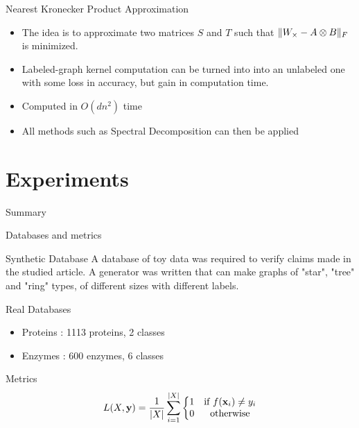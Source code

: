 \documentclass[compress]{beamer}
\DeclarePairedDelimiter{\abs}{\lvert}{\rvert}
\DeclarePairedDelimiter{\norm}{\lVert}{\rVert}
\let\vec\mathbf
\begin{document}
\begin{frame}{Nearest Kronecker Product Approximation}
\begin{itemize}
	\item The idea is to approximate two matrices $S$ and $T$ such that $\norm{W_\times - A\otimes B}_F$ is minimized.
	\item Labeled-graph kernel computation can be turned into into an unlabeled one with some loss in accuracy, but gain in computation time.
	\item Computed in $O(dn^2)$ time 
	\item All methods such as Spectral Decomposition can then be applied
\end{itemize}
\end{frame}


\section{Experiments}
\begin{frame}{Summary}
  \tableofcontents[currentsection]
\end{frame}
\begin{frame}{Databases and metrics}
    \begin{block}{Synthetic Database}
    	A database of toy data was required to verify claims made in the studied article. A generator was written that can make graphs of "star", "tree" and "ring" types, of different sizes with different labels.
    \end{block}
	\pause
	\begin{block}{Real Databases}
		\begin{itemize}
			\item Proteins : 1113 proteins, 2 classes
			\item Enzymes : 600 enzymes, 6 classes
		\end{itemize}
	\end{block}
	\pause
	\begin{block}{Metrics}
		\begin{equation*}
		L(X,\vec{y})=\frac{1}{\abs{X}}\sum\limits_{i=1}^{\abs{X}}\left\{
		\begin{matrix}
		1 & \mbox{if } f(\vec{x}_i) \neq y_i \\
		0 & \mbox{otherwise}
		\end{matrix}
		\right.
		\end{equation*}
	\end{block}
\end{frame}
\end{document}
